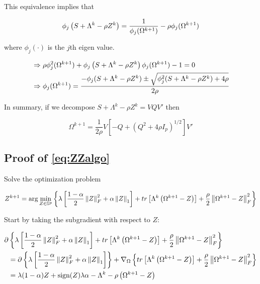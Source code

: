 \documentclass[11pt,]{report}
\theoremstyle{definition}
\theoremstyle{definition}
\theoremstyle{definition}
\theoremstyle{remark}
\begin{document}
This equivalence implies that

\begin{equation}
\phi_{j}\left( S + \Lambda^{k} - \rho Z^{k} \right) = \frac{1}{\phi_{j}(\Omega^{k + 1})} - \rho\phi_{j}(\Omega^{k + 1})\notag
\end{equation}

where \(\phi_{j}(\cdot)\) is the \(j\)th eigen value.

\begin{equation}
\begin{split}
  &\Rightarrow \rho\phi_{j}^{2}(\Omega^{k + 1}) + \phi_{j}\left( S + \Lambda^{k} - \rho Z^{k} \right)\phi_{j}(\Omega^{k + 1}) - 1 = 0 \\
  &\Rightarrow \phi_{j}(\Omega^{k + 1}) = \frac{-\phi_{j}(S + \Lambda^{k} - \rho Z^{k}) \pm \sqrt{\phi_{j}^{2}(S + \Lambda^{k} - \rho Z^{k}) + 4\rho}}{2\rho}
\end{split}
\notag
\end{equation}

In summary, if we decompose \(S + \Lambda^{k} - \rho Z^{k} = VQV'\) then

\begin{equation}
\Omega^{k + 1} = \frac{1}{2\rho}V\left[ -Q + (Q^{2} + 4\rho I_{p})^{1/2}\right] V'
\label{eq:appendixomegaproof}
\end{equation}

\hypertarget{proofZZalgo}{%
\subsection{Proof of \eqref{eq:ZZalgo}}\label{proofZZalgo}}

Solve the optimization problem

\begin{equation}
Z^{k + 1} = \arg\min_{Z \in \mathbb{S}^{p}}\left\{ \lambda\left[ \frac{1 - \alpha}{2}\left\| Z \right\|_{F}^{2} + \alpha\left\| Z \right\|_{1} \right] + tr\left[\Lambda^{k}\left(\Omega^{k + 1} - Z\right)\right] + \frac{\rho}{2}\left\| \Omega^{k + 1} - Z \right\|_{F}^{2} \right\}
\label{eq:appendixZZloglik}\notag
\end{equation}

Start by taking the subgradient with respect to \(Z\):

\begin{equation}
\begin{split}
  \partial&\left\{ \lambda\left[ \frac{1 - \alpha}{2}\left\| Z \right\|_{F}^{2} + \alpha\left\| Z \right\|_{1} \right] + tr\left[\Lambda^{k}\left(\Omega^{k + 1} - Z\right)\right] + \frac{\rho}{2}\left\| \Omega^{k + 1} - Z \right\|_{F}^{2} \right\} \\
  &= \partial\left\{ \lambda\left[ \frac{1 - \alpha}{2}\left\| Z \right\|_{F}^{2} + \alpha\left\| Z \right\|_{1} \right] \right\} + \nabla_{\Omega}\left\{ tr\left[\Lambda^{k}\left(\Omega^{k + 1} - Z\right)\right] + \frac{\rho}{2}\left\| \Omega^{k + 1} - Z \right\|_{F}^{2} \right\} \\
  &= \lambda(1 - \alpha)Z + \mbox{sign}(Z)\lambda\alpha - \Lambda^{k} - \rho\left( \Omega^{k + 1} - Z \right)
\label{eq:appendixZZgradient}\notag
\end{split}
\end{equation}
\end{document}

